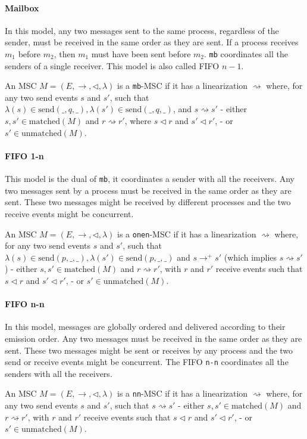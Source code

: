 \paragraph{Mailbox}
In this model, any two messages sent to the same process, regardless of the sender, 
must be received in the same order as they are sent. If a process receives $m_1$ 
before $m_2$, then $m_1$ must have been sent before $m_2$. \verb|mb| coordinates all 
the senders of a single receiver. This model is also called FIFO $n-1$.

An MSC $M = (E, \to, \lhd, \lambda)$ is a \verb|mb|-MSC if it has a linearization 
$\rightsquigarrow$ where, for any two send events $s$ and $s'$, such 
that $\lambda (s) \in \text{send}(\_,q,\_), \lambda (s') \in \text{send}(\_,q,\_)$, and 
$s \rightsquigarrow s'$
- either $s,s' \in \text{matched}(M)$ and $r \rightsquigarrow r'$, where 
$s \lhd r$ and $s' \lhd r'$,
- or $s' \in \text{unmatched}(M)$.

\paragraph{FIFO 1-n}
This model is the dual of \verb|mb|, it coordinates a sender with all the 
receivers. Any two messages sent by a process must be received in the same 
order as they are sent. These two messages might be received by different 
processes and the two receive events might be concurrent.

An MSC $M = (E, \to, \lhd, \lambda)$ is a \verb|onen|-MSC if it has a linearization 
$\rightsquigarrow$ where, for any two send events $s$ and $s'$, such 
that $\lambda (s) \in \text{send}(p,\_,\_), \lambda (s') \in \text{send}(p,\_,\_)$ and 
$s \to^+ s'$ (which implies $s \rightsquigarrow s'$)
- either $s,s' \in \text{matched}(M)$ and $r \rightsquigarrow r'$, with 
$r$ and $r'$ receive events such that $s \lhd r$ and $s' \lhd r'$,
- or $s' \in \text{unmatched}(M)$.

\paragraph{FIFO n-n}
In this model, messages are globally ordered and delivered according to 
their emission order. Any two messages must be received in the same order 
as they are sent. These two messages might be sent or receives by any process 
and the two send or receive events might be concurrent. The FIFO \verb|n-n| 
coordinates all the senders with all the receivers.

An MSC $M = (E, \to, \lhd, \lambda)$ is a \verb|nn|-MSC if it has a linearization 
$\rightsquigarrow$ where, for any two send events $s$ and $s'$, such 
that $s \rightsquigarrow s'$
- either $s, s' \in \text{matched}(M)$ and $r \rightsquigarrow r'$, with $r$ 
and $r'$ receive events such that $s \lhd r$ and $s' \lhd r'$,
- or $s' \in \text{unmatched}(M)$.

